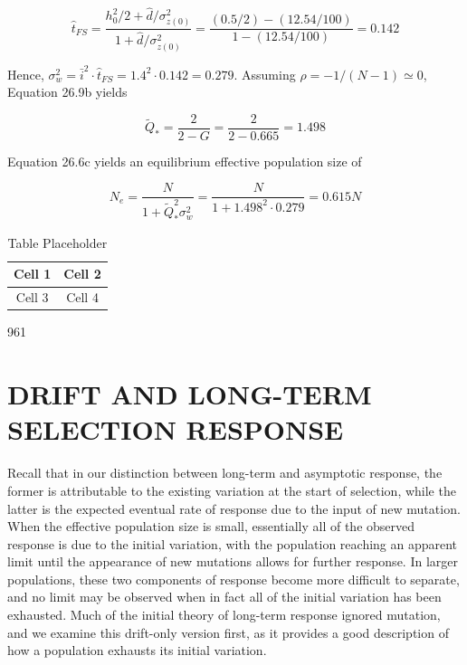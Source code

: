 \documentclass{article}
\begin{document}
\begin{equation}
\widehat{t}_{FS}=\frac{h_{0}^{2}/2+\widehat{d}/\sigma_{z(0)}^{2}}{1+\widehat{d}/\sigma_{z(0)}^{2}}=\frac{(0.5/2)-(12.54/100)}{1-(12.54/100)}=0.142
\end{equation}

Hence,  $ \sigma_w^2 = \bar{i}^2 \cdot \widehat{t}_{FS} = 1.4^2 \cdot 0.142 = 0.279 $. Assuming  $ \rho = -1/(N - 1) \simeq 0 $, Equation 26.9b yields

\begin{equation}
\widetilde{Q}_{*}=\frac{2}{2-G}=\frac{2}{2-0.665}=1.498
\end{equation}

Equation 26.6c yields an equilibrium effective population size of

\begin{equation}
N_{e}=\frac{N}{1+\widetilde{Q}_{*}^{2}\sigma_{w}^{2}}=\frac{N}{1+1.498^{2}\cdot0.279}=0.615N
\end{equation}

\begin{table}[h]
\centering
\begin{tabular}{|c|c|}
\hline
Cell 1 & Cell 2 \\
\hline
Cell 3 & Cell 4 \\
\hline
\end{tabular}
\caption{Table Placeholder}
\end{table}

961

\section{DRIFT AND LONG-TERM SELECTION RESPONSE}
Recall that in our distinction between long-term and asymptotic response, the former is attributable to the existing variation at the start of selection, while the latter is the expected eventual rate of response due to the input of new mutation. When the effective population size is small, essentially all of the observed response is due to the initial variation, with the population reaching an apparent limit until the appearance of new mutations allows for further response. In larger populations, these two components of response become more difficult to separate, and no limit may be observed when in fact all of the initial variation has been exhausted. Much of the initial theory of long-term response ignored mutation, and we examine this drift-only version first, as it provides a good description of how a population exhausts its initial variation.
\end{document}
